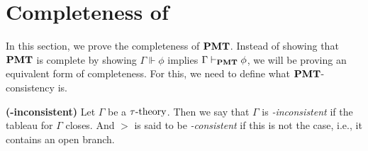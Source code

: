 \section{Completeness of \pmt}\label{completeness section}


\par In this section, we prove the completeness of $\textbf{PMT}$. Instead of showing that $\textbf{PMT}$ is complete by showing $\Gamma\Vdash \phi$ implies $\Gamma \vdash_{\textbf{PMT}} \phi$, we will be proving an equivalent form of completeness. For this, we need to define what $\textbf{PMT}$-consistency is.



\begin{definition}\label{flt-inconsistent}
    \textbf{(\pmt-inconsistent)} Let $\Gamma$ be a $\tau\text{-theory}$. Then we say that $\Gamma$ is \textit{\pmt-inconsistent} if the tableau for $\Gamma$ closes. And $\gt$ is said to be \textit{\pmt-consistent} if this is not the case, i.e., it contains an open branch.
\end{definition}



